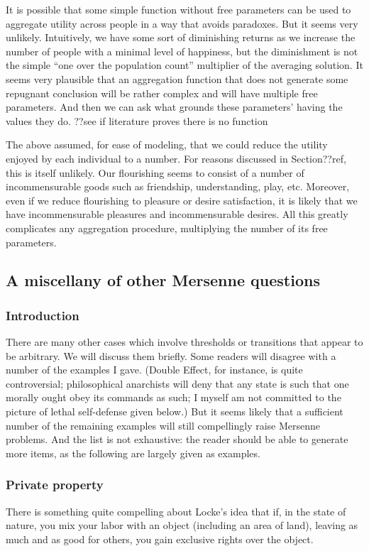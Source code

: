 It is possible that some simple function without free parameters can be used to aggregate utility across people in a way that
avoids paradoxes. But it seems very unlikely. Intuitively, we have some sort of diminishing returns as we increase the number of
people with a minimal level of happiness, but the diminishment is not the simple ``one over the population count'' multiplier of
the averaging solution. It seems very plausible that an aggregation function that does not generate some repugnant conclusion will
be rather complex and will have multiple free parameters. And then we can ask what grounds these parameters' having the values they
do. ??see if literature proves there is no function


The above assumed, for ease of modeling, that we could reduce the utility enjoyed by each individual to a number. For reasons 
discussed in Section??ref, this is itself unlikely. Our flourishing seems to consist of a number of incommensurable goods such 
as friendship, understanding, play, etc. Moreover, even if we reduce flourishing to pleasure or desire satisfaction, it is 
likely that we have incommensurable pleasures and incommensurable desires. All this greatly complicates any aggregation procedure,
multiplying the number of its free parameters.

\subsection{A miscellany of other Mersenne questions}
\subsubsection{Introduction}
There are many other cases which involve thresholds or transitions that appear to be arbitrary. We will discuss them briefly.
Some readers will disagree with a number of the examples I gave. (Double Effect, for instance, is quite controversial;  philosophical
anarchists will deny that any state is such that one morally ought obey its commands as such; I myself am not committed to 
the picture of lethal self-defense given below.) But it seems
likely that a sufficient number of the remaining examples will still compellingly raise Mersenne problems. And the list is not
exhaustive: the reader should be able to generate more items, as the following are largely given as examples.

\subsubsection{Private property}
There is something quite compelling about Locke's idea that if, in the state of nature, you mix your labor with 
an object (including an area of land), leaving as much and as good for others, you gain exclusive rights over 
the object. 

